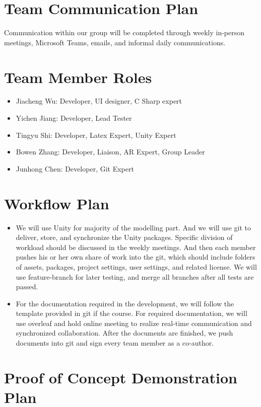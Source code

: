 \documentclass{article}
\begin{document}
\section{Team Communication Plan}
Communication within our group will be completed through weekly in-person meetings, Microsoft Teams, emails, and informal daily communications. 

\section{Team Member Roles}
\begin{itemize}
    \item Jiacheng Wu: Developer, UI designer, C Sharp expert
    \item Yichen Jiang: Developer, Lead Tester
    \item Tingyu Shi: Developer, Latex Expert, Unity Expert
    \item Bowen Zhang: Developer, Liaison, AR Expert, Group Leader
    \item Junhong Chen: Developer, Git Expert
\end{itemize}

\section{Workflow Plan}

\begin{itemize}
	\item We will use Unity for majority of the modelling part. And we will use git to deliver, store, and synchronize the Unity packages. Specific division of workload should be discussed in the weekly meetings. And then each member pushes his or her own share of work into the git, which should include folders of assets, packages, project settings, user settings, and related license. We will use feature-branch for later testing, and merge all branches after all tests are passed. 
	\item For the documentation required in the development, we will follow the template provided in git if the course. For required documentation, we will use overleaf and hold online meeting to realize real-time communication and synchronized collaboration. After the documents are finished, we push documents into git and sign every team member as a co-author. 
\end{itemize}

\section{Proof of Concept Demonstration Plan}
\end{document}
